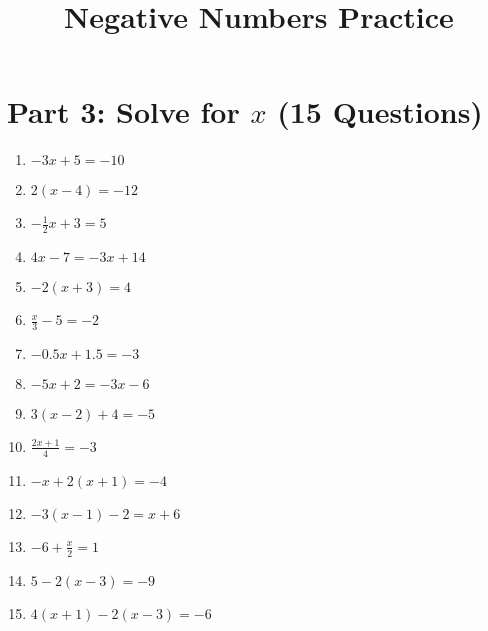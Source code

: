 \documentclass[12pt]{article}
\title{Negative Numbers Practice}
\date{}
\begin{document}
\maketitle

\section*{Part 3: Solve for $x$ (15 Questions)}
\begin{enumerate}
  \item $-3x + 5 = -10$
  \item $2(x - 4) = -12$
  \item $-\frac{1}{2}x + 3 = 5$
  \item $4x - 7 = -3x + 14$
  \item $-2(x + 3) = 4$
  \item $\frac{x}{3} - 5 = -2$
  \item $-0.5x + 1.5 = -3$
  \item $-5x + 2 = -3x - 6$
  \item $3(x - 2) + 4 = -5$
  \item $\frac{2x + 1}{4} = -3$
  \item $-x + 2(x + 1) = -4$
  \item $-3(x - 1) - 2 = x + 6$
  \item $-6 + \frac{x}{2} = 1$
  \item $5 - 2(x - 3) = -9$
  \item $4(x + 1) - 2(x - 3) = -6$
\end{enumerate}
\end{document}
